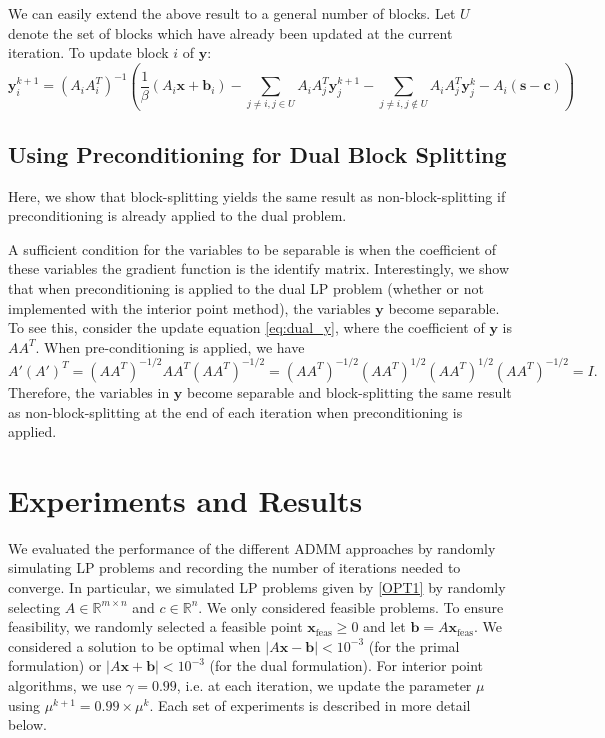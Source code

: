\documentclass{article}
\begin{document}
We can easily extend the above result to a general number of blocks. Let $U$ denote the set of blocks which have already been updated at the current iteration. To update block $i$ of $\mathbf{y}$:
\[
\mathbf{y}_{i}^{k+1}=\left(A_{i}A_{i}^{T}\right)^{-1}\left(\frac{1}{\beta}\left(A_{i}\mathbf{x}+\mathbf{b}_{i}\right)-\sum_{j\neq i,j\in U}A_{i}A_{j}^{T}\mathbf{y}_{j}^{k+1}-\sum_{j\neq i,j\notin U}A_{i}A_{j}^{T}\mathbf{y}_{j}^{k}-A_{i}\left(\mathbf{s}-\mathbf{c}\right)\right)
\]
\vspace{0.1in}
{ \subsection*{Using Preconditioning for Dual Block Splitting}
Here, we show that block-splitting yields the same result as non-block-splitting if preconditioning is already applied to the dual problem. 

A sufficient condition for the variables to be separable is when the coefficient of these variables the gradient function is the identify matrix. Interestingly, we show that when preconditioning is applied to the dual LP problem (whether or not implemented with the interior point method), the variables $\mathbf{y}$ become separable. To see this, consider the update equation \eqref{eq:dual_y}, where the coefficient of $\mathbf{y}$ is $A A^T$. When pre-conditioning is applied, we have
\[
A' (A')^T  = (AA^T )^{-1/2}A A^T (AA^T )^{-1/2} =  (AA^T )^{-1/2}(AA^T )^{1/2} (AA^T )^{1/2} (AA^T )^{-1/2}  = I.
\]
Therefore, the variables in $\mathbf{y}$ become separable and block-splitting the same result as non-block-splitting at the end of each iteration when preconditioning is applied. 

\newpage
\section{Experiments and Results}

We evaluated the performance of the different ADMM approaches by randomly simulating LP problems and recording the number of iterations needed to converge. In particular, we simulated LP problems given by \eqref{OPT1} by randomly selecting $A\in\mathbb{R}^{m \times n}$ and $c\in\mathbb{R}^{n}$. We only considered feasible problems. To ensure feasibility, we randomly selected a feasible point $\mathbf{x}_{\text{feas}}\geq0$ and let $\mathbf{b}=A\mathbf{x}_{\text{feas}}$. We considered a solution to be optimal when $\left|A\mathbf{x}-\mathbf{b}\right|<10^{-3}$ (for the primal formulation) or $\left|A\mathbf{x}+\mathbf{b}\right|<10^{-3}$ (for the dual formulation). For interior point algorithms, we use $\gamma=0.99$, i.e. at each iteration, we update the parameter $\mu$ using $\mu^{k+1} = 0.99 \times \mu^k$. Each set of experiments is described in more detail below.

}
\end{document}
